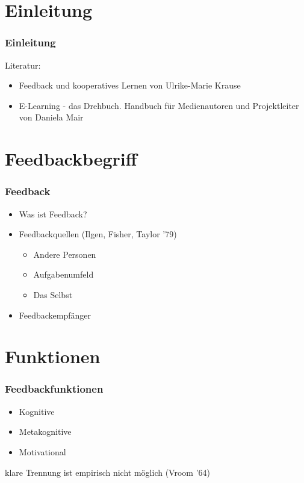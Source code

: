 
%
%

\section{Einleitung}

\begin{frame}
	\frametitle{Einleitung}

	Literatur:
	\begin{itemize}
		\item Feedback und kooperatives Lernen von Ulrike-Marie Krause
		\item E-Learning - das Drehbuch. Handbuch für Medienautoren und Projektleiter von Daniela Mair
	\end{itemize}
\end{frame}

\section{Feedbackbegriff}

\begin{frame}[<+->]
	\frametitle{Feedback}
	\begin{itemize}
		\item Was ist Feedback?
		\item Feedbackquellen \small(Ilgen, Fisher, Taylor '79)
		\begin{itemize}
		    \item Andere Personen
			\item Aufgabenumfeld
			\item Das Selbst
		\end{itemize}
		\item Feedbackempfänger
	\end{itemize}
\end{frame}


\section{Funktionen}

\begin{frame}[<+->]
	\frametitle{Feedbackfunktionen}
	\begin{itemize}
		\item Kognitive
		\item Metakognitive
		\item Motivational
	\end{itemize}


	klare Trennung ist empirisch nicht möglich \small(Vroom '64)
\end{frame}

